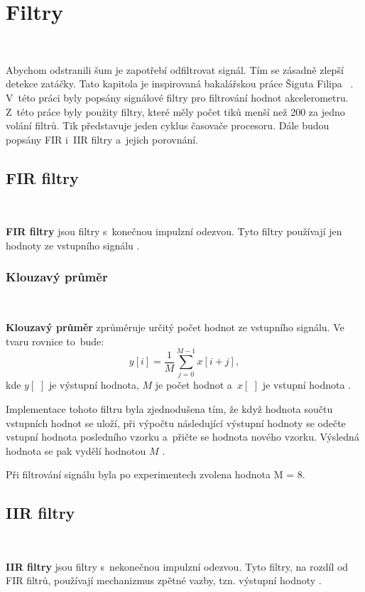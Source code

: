 \chapter{Filtry}
\label{sec:Filters}\

Abychom odstranili šum je zapotřebí odfiltrovat signál. Tím se zásadně zlepší
detekce zatáčky. Tato kapitola je inspirovaná bakalářskou práce Šiguta Filipa
~\cite{krokomer}. V~této práci byly popsány 
signálové filtry pro filtrování hodnot akcelerometru. Z~této práce byly použity 
filtry, které měly počet tiků menší než 200 za jedno volání filtrů. Tik představuje jeden cyklus časovače procesoru. Dále budou popsány FIR i~IIR filtry a~jejich porovnání.

\section{FIR filtry}\

\textbf{FIR filtry} jsou filtry s~konečnou impulzní odezvou. Tyto filtry používají
jen hodnoty ze vstupního signálu \cite{FIR}.

\subsection{Klouzavý průměr}\

\textbf{Klouzavý průměr} zprůměruje určitý počet hodnot ze vstupního signálu. Ve
tvaru rovnice to~bude:
\begin{equation}
y[i] = \frac{1}{M}\sum_{j = 0}^{M - 1}x[i+j],
\end{equation}
kde $y[\,\,]$ je výstupní hodnota, $M$ je počet hodnot a~$x[\,\,]$ je vstupní
hodnota \cite{Filters}.

Implementace tohoto filtru byla zjednodušena tím, že když hodnota součtu vstupních
hodnot se uloží, při výpočtu následující výstupní hodnoty se odečte vstupní hodnota
posledního vzorku a~přičte se hodnota nového vzorku. Výsledná hodnota se pak vydělí
hodnotou $M$ \cite{krokomer}.

Při filtrování signálu byla po experimentech zvolena hodnota M = 8.

\section{IIR filtry}\

\textbf{IIR filtry} jsou filtry s~nekonečnou impulzní odezvou. Tyto filtry, 
na rozdíl od FIR filtrů, používají mechanizmus zpětné vazby, tzn. výstupní
hodnoty \cite{IIR}.

